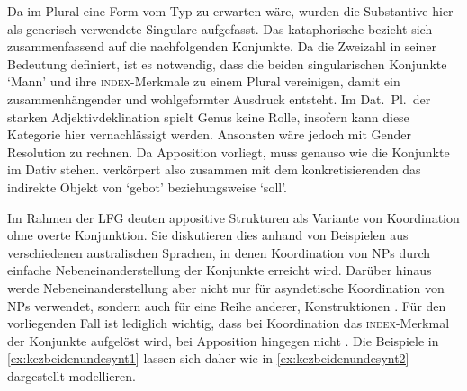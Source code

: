 Da im Plural eine Form vom Typ  zu erwarten wäre, wurden die
Substantive hier als generisch verwendete Singulare aufgefasst. Das
kataphorische  bezieht sich zusammenfassend auf die nachfolgenden
Konjunkte. Da  die Zweizahl in seiner Bedeutung definiert, ist
es notwendig, dass die beiden singularischen Konjunkte  `Mann'
und  ihre \textsc{index}-Merkmale zu einem Plural vereinigen, damit ein
zusammenhängender und wohlgeformter Ausdruck entsteht. Im Dat.~Pl.\ der starken
Adjektivdeklination spielt Genus keine Rolle, insofern kann diese Kategorie
hier vernachlässigt werden. Ansonsten wäre jedoch mit Gender Resolution zu
rechnen. Da Apposition vorliegt, muss  genauso wie die Konjunkte im
Dativ stehen.  verkörpert also zusammen mit dem konkretisierenden
 das indirekte Objekt von  `gebot'
beziehungsweise  `soll'.

Im Rahmen der LFG deuten \citet{sadlernordlinger2006} appositive Strukturen als
Variante von Koordination ohne overte Konjunktion. Sie diskutieren dies anhand
von Beispielen aus verschiedenen australischen Sprachen, in denen Koordination
von NPs durch einfache Nebeneinanderstellung der Konjunkte erreicht wird.
Darüber hinaus werde Nebeneinanderstellung aber nicht nur für asyndetische
Koordination von NPs verwendet, sondern auch für eine Reihe anderer,
 Konstruktionen
\autocite[440--441]{sadlernordlinger2006}. Für den vorliegenden Fall ist
lediglich wichtig, dass bei Koordination das \textsc{index}-Merkmal der Konjunkte
aufgelöst wird, bei Apposition hingegen nicht
\autocite[444]{sadlernordlinger2006}. Die Beispiele in
\cref{ex:kczbeidenundesynt1} lassen sich daher wie in
\cref{ex:kczbeidenundesynt2} dargestellt modellieren.


